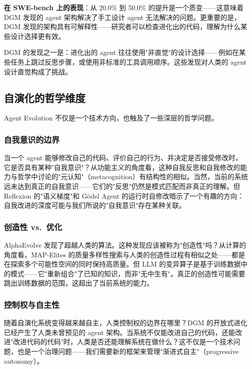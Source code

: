 \textbf{在 SWE-bench 上的表现}：从 20.0\% 到 50.0\% 的提升是一个质变——这意味着 DGM 发现的 agent 架构解决了手工设计 agent 无法解决的问题。更重要的是，DGM 发现的架构具有可解释性——研究者可以检查进化出的代码，理解为什么某些设计选择更有效。

DGM 的发现之一是：进化出的 agent 往往使用"非直觉"的设计选择——例如在某些任务上跳过反思步骤，或使用非标准的工具调用顺序。这些发现对人类的 agent 设计直觉构成了挑战。

\subsection{自演化的哲学维度}\label{sec:intro-philosophy}

Agent Evolution 不仅是一个技术方向，也触及了一些深层的哲学问题。

\subsubsection{自我意识的边界}

当一个 agent 能够修改自己的代码、评价自己的行为、并决定是否接受修改时，它是否具有某种"自我意识"？从功能主义的角度看，这种自我反思和自我修改的能力与哲学中讨论的"元认知"（metacognition）有结构性的相似。当然，当前的系统远未达到真正的自我意识——它们的"反思"仍然是模式匹配而非真正的理解。但 Reflexion 的"语义梯度"和 Gödel Agent 的运行时自修改暗示了一个有趣的方向：自我改进的深度可能与我们所说的"自我意识"存在某种关联。

\subsubsection{创造性 vs.\ 优化}

AlphaEvolve 发现了超越人类的算法。这种发现应该被称为"创造性"吗？从计算的角度看，MAP-Elites 的质量多样性搜索与人类的创造性过程有相似之处——都是在探索多个可能性空间的同时保持高质量。但 LLM 的变异算子是基于训练数据中的模式——它"重新组合"了已知的知识，而非"无中生有"。真正的创造性可能需要跳出训练数据的范围，这超出了当前系统的能力。

\subsubsection{控制权与自主性}

随着自演化系统变得越来越自主，人类控制权的边界在哪里？DGM 的开放式进化已经产生了人类未曾预见的 agent 架构。当系统不仅能改进自己的代码，还能改进"改进代码的代码"时，人类是否还能理解系统在做什么？这不仅是一个技术问题，也是一个治理问题——我们需要新的框架来管理"渐进式自主"（progressive autonomy）。


